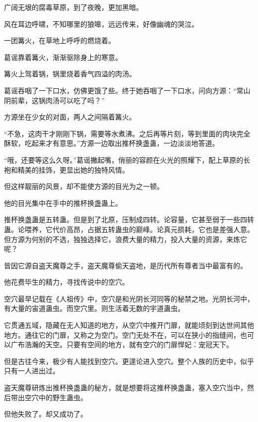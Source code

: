 
\begin{this_body}



广阔无垠的腐毒草原，到了夜晚，更加黑暗。

风在耳边呼啸，不知哪里的狼嗥，远远传来，好像幽魂的哭泣。

一团篝火，在草地上呼呼的燃烧着。

葛谣靠着篝火，渐渐驱除身上的寒意。

篝火上驾着锅，锅里烧着香气四溢的肉汤。

葛谣吞咽了一下口水，仿佛更饿了些。终于她吞咽了一下口水，问向方源：“常山阴前辈，这锅肉汤可以吃了吗？”

方源坐在少女的对面，两人之间隔着篝火。

“不急，这肉干才刚刚下锅，需要等水煮沸。之后再等片刻，等到里面的肉块完全酥软，吃起来才有意思。”方源一边取出推杯换盏蛊，一边淡淡地答道。

“哦，还要等这么久呀。”葛谣撇起嘴，俏丽的容颜在火光的照耀下，配上草原的长袍和精美的挂饰，更显出她的独特风情。

但这样靓丽的风景，却不能使方源的目光为之一顿。

他的目光集中在手中的推杯换盏蛊上。

推杯换盏蛊是五转蛊。但是到了北原，压制成四转。论容量，它甚至弱于一些四转蛊。论喂养，它代价高昂，占据五转蛊虫的巅峰。论真元损耗，它也是差强人意。但方源为何别的不选，独独选择它，浪费大量的精力，投入大量的资源，来炼它呢？

皆因它源自盗天魔尊之手，盗天魔尊偷天盗地，是历代所有尊者当中最富有的。

他花费毕生的精力，寻找传说中的空穴。

空穴最早记载在《人祖传》中，空穴是和光阴长河同等的秘禁之地。光阴长河中，有大量的宙道蛊虫。而空穴里。则生活着无数的宇道蛊虫。

它贯通五域，隐藏在无人知道的地方，从空穴中推开门扉，就能顷刻到达世间其他地方。通往它的门扉，又称之为空门。空门无处不在，可以在狭小的指缝间，也可以广布浩瀚的天空。只要有空间的地方，就有空穴的门扉悍妃：宠冠天下。

但是古往今来，极少有人能找到空穴。更遑论进入空穴。整个人族的历史中，似乎只有一人进出过。

盗天魔尊研炼出推杯换盏蛊的秘方，就是想要将这推杯换盏蛊，塞入空穴当中，然后带出空穴中的野生蛊虫。

但他失败了。却又成功了。


\end{this_body}
